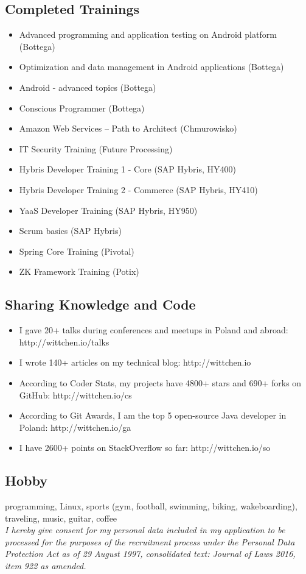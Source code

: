 \documentclass{article}
\begin{document}
    \subsection*{Completed Trainings}
    \begin{itemize}
      \item Advanced programming and application testing on Android platform (Bottega)
      \item Optimization and data management in Android applications (Bottega)
      \item Android - advanced topics (Bottega)
      \item Conscious Programmer (Bottega)
      \item Amazon Web Services – Path to Architect (Chmurowisko)
      \item IT Security Training (Future Processing)
      \item Hybris Developer Training 1 - Core (SAP Hybris, HY400)
      \item Hybris Developer Training 2 - Commerce (SAP Hybris, HY410)
      \item YaaS Developer Training (SAP Hybris, HY950)
      \item Scrum basics (SAP Hybris)
      \item Spring Core Training (Pivotal)
      \item ZK Framework Training (Potix)
    \end{itemize}

    \subsection*{Sharing Knowledge and Code}
    \begin{itemize}
      \item I gave 20+ talks during conferences and meetups in Poland and abroad: http://wittchen.io/talks
      \item I wrote 140+ articles on my technical blog: http://wittchen.io
      \item According to Coder Stats, my projects have 4800+ stars and 690+ forks on GitHub: http://wittchen.io/cs
      \item According to Git Awards, I am the top 5 open-source Java developer in Poland: http://wittchen.io/ga
      \item I have 2600+ points on StackOverflow so far: http://wittchen.io/so
    \end{itemize}

    \subsection*{Hobby}
    programming, Linux, sports (gym, football, swimming, biking, wakeboarding), traveling, music, guitar, coffee\\

    \textit{
    I hereby give consent for my personal data included in my application
    to be processed for the purposes of the recruitment process
    under the Personal Data Protection Act as of 29 August 1997,
    consolidated text: Journal of Laws 2016, item 922 as amended.
    }
\end{document}
